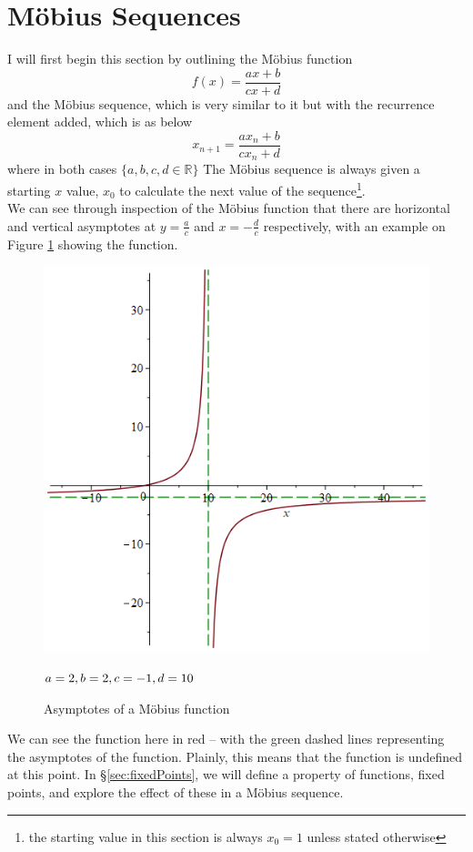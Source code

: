 \documentclass[12pt]{article}
\begin{document}
\section{Möbius Sequences}\label{s_mob}
I will first begin this section by outlining the Möbius function
\[f(x) = \frac{ax+b}{cx+d}\]
and the Möbius sequence, which is very similar to it but with the recurrence element added, which is as below 
	\[x_{n+1} = \frac{ax_n+b}{cx_n+d}\]
where in both cases $\{a, b, c, d \in \mathbb{R}\}$ The Möbius sequence is always given a starting $x$ value, $x_0$ to calculate the next value of the sequence\footnote{the starting value in this section is always $x_0=1$ unless stated otherwise}. \\
We can see through inspection of the Möbius function that there are horizontal and vertical asymptotes at $y=\frac{a}{c}$ and $x=-\frac{d}{c}$ respectively, with an example on Figure \ref{fig:mobAsymp} showing the function.
	\begin{figure}[H]
		\begin{minipage}{0.725\textwidth}
			\hfill
			\includegraphics[scale=0.4]{mobAsymp.png}
		\end{minipage}
	\hfill
		\begin{minipage}{0.2\textwidth}
			$a=2,\\b=2,\\ c=-1,\\ d=10\\$
		\end{minipage}
	\caption{Asymptotes of a Möbius function}
	\label{fig:mobAsymp}
	\end{figure}
We can see the function here in red -- with the green dashed lines representing the asymptotes of the function. Plainly, this means that the function is undefined at this point.
In \S\ref{sec:fixedPoints}, we will define a property of functions, fixed points, and explore the effect of these in a Möbius sequence.
\newpage
\end{document}
